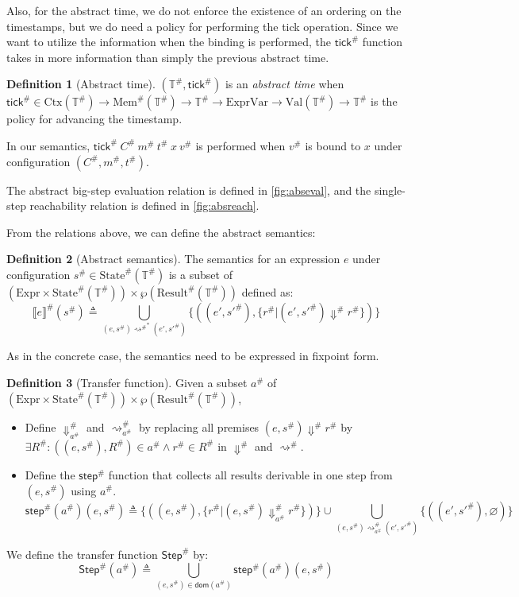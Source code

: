 \documentclass[acmsmall,screen,review]{acmart}
\theoremstyle{definition}
\newtheorem{definition}{Definition}[section]
\newcommand*{\A}[1]{{#1}^{\#}}
\newcommand*{\Expr}{\text{Expr}}
\newcommand*{\ExprVar}{\text{ExprVar}}
\newcommand*{\Time}{\mathbb{T}}
\newcommand*{\ATime}{\A{\Time}}
\newcommand*{\Ctx}[1]{\text{Ctx}({#1})}
\newcommand*{\Value}[1]{\text{Val}({#1})}
\newcommand*{\mem}{m}
\newcommand*{\AMem}[1]{\A{\text{Mem}}({#1})}
\newcommand*{\AConfig}[1]{\A{\text{State}}({#1})}
\newcommand*{\AResult}[1]{\A{\text{Result}}({#1})}
\newcommand*{\sembracket}[1]{\lBrack{#1}\rBrack}
\newcommand*{\tick}{\mathsf{tick}}
\begin{document}
Also, for the abstract time, we do not enforce the existence of an ordering on the timestamps, but we do need a policy for performing the tick operation.
Since we want to utilize the information when the binding is performed, the $\A{\tick}$ function takes in more information than simply the previous abstract time.
\begin{definition}[Abstract time]
  $(\ATime,\A{\tick})$ is an \emph{abstract time} when $\A{\tick}\in\Ctx{\ATime}\rightarrow\AMem{\ATime}\rightarrow\ATime\rightarrow\ExprVar\rightarrow\Value{\ATime}\rightarrow\ATime$ is the policy for advancing the timestamp.
\end{definition}
In our semantics, $\A{\tick}\:\A{C}\:\A{\mem}\:\A{t}\:x\:\A{v}$ is performed when $\A{v}$ is bound to $x$ under configuration $(\A{C},\A{\mem},\A{t})$.

The abstract big-step evaluation relation is defined in \ref{fig:abseval}, and the single-step reachability relation is defined in \ref{fig:absreach}.

From the relations above, we can define the abstract semantics:
\begin{definition}[Abstract semantics]
  The semantics for an expression $e$ under configuration $\A{s}\in\AConfig{\ATime}$ is a subset of $(\Expr\times\AConfig{\ATime})\times{\wp(\AResult{\ATime})}$ defined as:
  \[
    \A{\sembracket{e}}(\A{s})\triangleq\bigcup_{(e,\A{s}){\A\rightsquigarrow}^{*}(e',\A{s'})}\{((e',\A{s'}),\{\A{r}|(e',\A{s'})\A\Downarrow \A{r}\})\}
  \]
\end{definition}

As in the concrete case, the semantics need to be expressed in fixpoint form.

\begin{definition}[Transfer function]
  Given a subset $\A{a}$ of $(\Expr\times\AConfig{\ATime})\times{\wp(\AResult{\ATime})}$,

  \begin{itemize}
    \item Define $\A{\Downarrow}_{\A{a}}$ and $\A{\rightsquigarrow}_{\A{a}}$ by replacing all premises $(e,\A{s})\A\Downarrow\A{r}$ by $\exists \A{R}:((e,\A{s}),\A{R})\in \A{a}\wedge \A{r}\in \A{R}$ in $\A\Downarrow$ and $\A\rightsquigarrow$.
    \item Define the $\A{\mathsf{step}}$ function that collects all results derivable in one step from $(e,\A{s})$ using $\A{a}$.
          \[
            \A{\mathsf{step}}(\A{a})(e,\A{s})\triangleq
            \{((e,\A{s}),\{\A{r}|(e,\A{s})\A{\Downarrow}_{\A{a}}\A{r}\})\}
            \cup
            \bigcup_{(e,\A{s})\A{\rightsquigarrow}_{\A{a}}(e',\A{s'})}\{((e',\A{s'}),\varnothing)\}
          \]
  \end{itemize}

  We define the transfer function $\A{\mathsf{Step}}$ by:
  \[
    \A{\mathsf{Step}}(\A{a})\triangleq
    \bigcup_{(e,\A{s})\in\mathsf{dom}(\A{a})}
    {\A{\mathsf{step}}(\A{a})(e,\A{s})}
  \]
\end{definition}
\end{document}
